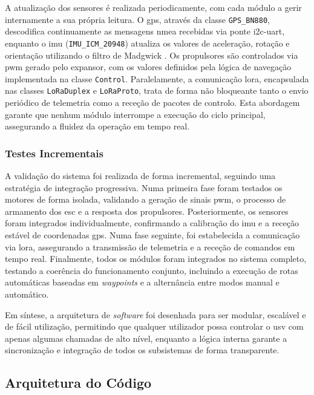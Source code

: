 A atualização dos sensores é realizada periodicamente, com cada módulo a gerir internamente a sua própria leitura. O \gls{gps}, através da classe \texttt{GPS\_BN880}, descodifica continuamente as mensagens \gls{nmea} recebidas via ponte \gls{i2c}-\gls{uart}, enquanto o \gls{imu} (\texttt{IMU\_ICM\_20948}) atualiza os valores de aceleração, rotação e orientação utilizando o filtro de Madgwick \cite{madgwick-filter}. Os propulsores são controlados via \gls{pwm} gerado pelo expansor, com os valores definidos pela lógica de navegação implementada na classe \texttt{Control}. Paralelamente, a comunicação \gls{lora}, encapsulada nas classes \texttt{LoRaDuplex} e \texttt{LoRaProto}, trata de forma não bloqueante tanto o envio periódico de telemetria como a receção de pacotes de controlo. Esta abordagem garante que nenhum módulo interrompe a execução do ciclo principal, assegurando a fluidez da operação em tempo real.

\subsubsection{Testes Incrementais}

A validação do sistema foi realizada de forma incremental, seguindo uma estratégia de integração progressiva. Numa primeira fase foram testados os motores de forma isolada, validando a geração de sinais \gls{pwm}, o processo de armamento dos \gls{esc} e a resposta dos propulsores. Posteriormente, os sensores foram integrados individualmente, confirmando a calibração do \gls{imu} e a receção estável de coordenadas \gls{gps}. Numa fase seguinte, foi estabelecida a comunicação via \gls{lora}, assegurando a transmissão de telemetria e a receção de comandos em tempo real. Finalmente, todos os módulos foram integrados no sistema completo, testando a coerência do funcionamento conjunto, incluindo a execução de rotas automáticas baseadas em \emph{waypoints} e a alternância entre modos manual e automático.

Em síntese, a arquitetura de \emph{software} foi desenhada para ser modular, escalável e de fácil utilização, permitindo que qualquer utilizador possa controlar o \gls{usv} com apenas algumas chamadas de alto nível, enquanto a lógica interna garante a sincronização e integração de todos os subsistemas de forma transparente.

\subsection{Arquitetura do Código}
\label{subsec:arquitetura-codigo}

